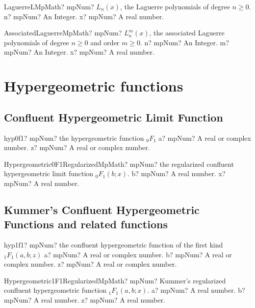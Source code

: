 \documentclass[12pt,a4paper,openany]{book}
\begin{document}
\begin{mpFunctionsExtract}
\mpFunctionTwoNotImplemented
{LaguerreLMpMath? mpNum? $L_n (x)$, the Laguerre polynomials of degree $n \geq 0$.}
{n? mpNum? An Integer.}
{x? mpNum? A real number.}
\end{mpFunctionsExtract}

\begin{mpFunctionsExtract}
\mpFunctionThreeNotImplemented
{AssociatedLaguerreMpMath? mpNum? $L^m_n (x)$, the associated Laguerre polynomials of degree $n \geq 0$ and order $m \geq 0$.}
{n? mpNum? An Integer.}
{m? mpNum? An Integer.}
{x? mpNum? A real number.}
\end{mpFunctionsExtract}

\chapter{Hypergeometric functions}

\section{Confluent Hypergeometric Limit Function}

\begin{mpFunctionsExtract}
\mpFunctionTwo
{hyp0f1? mpNum? the hypergeometric function ${}_0F_1$}
{a? mpNum? A real or complex number.}
{z? mpNum? A real or complex number.}
\end{mpFunctionsExtract}

\begin{mpFunctionsExtract}
\mpFunctionTwoNotImplemented
{Hypergeometric0F1RegularizedMpMath? mpNum? the regularized confluent hypergeometric limit function ${}_0F_1(b; x)$.}
{b? mpNum? A real number.}
{x? mpNum? A real number.}
\end{mpFunctionsExtract}

\section{Kummer's Confluent Hypergeometric Functions and related functions}

\begin{mpFunctionsExtract}
\mpFunctionThree
{hyp1f1? mpNum? the confluent hypergeometric function of the first kind ${}_1F_1(a,b;z)$}
{a? mpNum? A real or complex number.}
{b? mpNum? A real or complex number.}
{z? mpNum? A real or complex number.}
\end{mpFunctionsExtract}

\begin{mpFunctionsExtract}
\mpFunctionThreeNotImplemented
{Hypergeometric1F1RegularizedMpMath? mpNum? Kummer's regularized confluent hypergeometric function ${}_1F_1(a, b; x)$.}
{a? mpNum? A real number.}
{b? mpNum? A real number.}
{z? mpNum? A real number.}
\end{mpFunctionsExtract}
\end{document}
